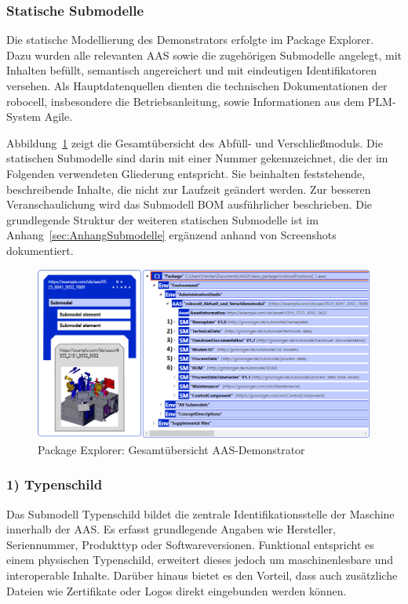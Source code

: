 \subsubsection{Statische Submodelle}
Die statische Modellierung des Demonstrators erfolgte im Package Explorer.
Dazu wurden alle relevanten AAS sowie die zugehörigen Submodelle angelegt, mit Inhalten befüllt, semantisch angereichert und mit eindeutigen Identifikatoren versehen.
Als Hauptdatenquellen dienten die technischen Dokumentationen der robocell, insbesondere die Betriebsanleitung, sowie Informationen aus dem PLM-System Agile.

Abbildung~\ref{fig:PackageExplorerRobocell} zeigt die Gesamtübersicht des Abfüll- und Verschließmoduls. 
Die statischen Submodelle sind darin mit einer Nummer gekennzeichnet, die der im Folgenden verwendeten Gliederung entspricht. 
Sie beinhalten feststehende, beschreibende Inhalte, die nicht zur Laufzeit geändert werden. 
Zur besseren Veranschaulichung wird das Submodell BOM ausführlicher beschrieben.
Die grundlegende Struktur der weiteren statischen Submodelle ist im Anhang~\ref{sec:AnhangSubmodelle} ergänzend anhand von Screenshots dokumentiert.

\begin{figure}[htbp]
    \centering
        \includegraphics[width=1\textwidth]{Bilder/ErgebnissePackageExplorer/AASrobocell.PNG}
    \caption{Package Explorer: Gesamtübersicht AAS-Demonstrator}
    \label{fig:PackageExplorerRobocell}
\end{figure}

\subsubsection*{1) Typenschild}
\vspace{-0.5em} 
Das Submodell Typenschild bildet die zentrale Identifikationsstelle der Maschine innerhalb der AAS. 
Es erfasst grundlegende Angaben wie Hersteller, Seriennummer, Produkttyp oder Softwareversionen. 
Funktional entspricht es einem physischen Typenschild, erweitert dieses jedoch um maschinenlesbare und interoperable Inhalte. 
Darüber hinaus bietet es den Vorteil, dass auch zusätzliche Dateien wie Zertifikate oder Logos direkt eingebunden werden können.

